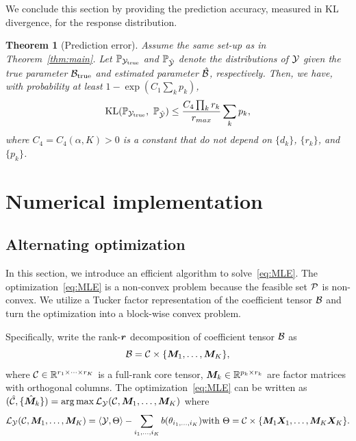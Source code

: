 \documentclass{article}
\theoremstyle{plain}
\newtheorem{thm}{Theorem}[section]
\theoremstyle{definition}
\begin{document}
We conclude this section by providing the prediction accuracy, measured in KL divergence, for the response distribution.   

\begin{thm}[Prediction error]\label{thm:KL}
Assume the same set-up as in Theorem~\ref{thm:main}. Let $\mathbb{P}_{\mathcal{Y}_{\text{true}}}$ and $\mathbb{P}_{\hat {\mathcal{Y}}}$ denote the distributions of $\mathcal{Y}$ given the true parameter $\mathcal{B}_{\text{true}}$ and estimated parameter $\hat {\mathcal{B}}$, respectively. Then, we have, with probability at least $1-\exp(C_1\sum_k p_k)$,
\begin{align*}
    \text{KL}(\mathbb{P}_{\mathcal{Y}_{\text{true}}},\ \mathbb{P}_{\hat {\mathcal{Y}}})\leq  \frac{ C_{4}\prod_kr_k}{r_{max}} \sum_k p_k,
\end{align*}
\vspace{-.1cm}
where $C_4=C_4(\alpha, K)>0$ is a constant that do not depend on $\{d_k\}$, $\{r_k\}$, and $\{p_k\}$.
\end{thm}
\vspace{-.2cm}

\section{Numerical implementation}
\subsection{Alternating optimization}
In this section, we introduce an efficient algorithm to solve~\eqref{eq:MLE}. The optimization~\eqref{eq:MLE} is a non-convex problem because the feasible set $\mathcal{P}$ is non-convex. We utilize a Tucker factor representation of the coefficient tensor $\mathcal{B}$ and turn the optimization into a block-wise convex problem. 

Specifically, write the rank-$\bm{r}$ decomposition of coefficient tensor $\mathcal{B}$ as
\vspace{-.1cm}
\begin{equation}\label{eq:tucker}
\mathcal{B}=\mathcal{C}\times \{\bm M_1,\ldots,\bm M_K\},
\end{equation}
where $\mathcal{C}\in\mathbb{R}^{r_1\times\cdots\times r_K}$ is a full-rank core tensor, $\bm M_k\in\mathbb{R}^{p_k\times r_k}$ are factor matrices with orthogonal columns. The optimization~\eqref{eq:MLE} can be written as $ (\hat {\mathcal{C}}, \{\hat {\bm M}_k\})=\arg\max \mathcal{L}_{\mathcal{Y}}(\mathcal{C}, \bm M_1,\ldots,\bm M_K) $ where 
\vspace{-.05cm}
\begin{equation*}
    \mathcal{L}_{\mathcal{Y}}(\mathcal{C}, \bm M_1,\ldots,\bm M_K) = \langle \mathcal{Y}, \Theta\rangle -\sum_{i_1,\ldots,i_K}b(\theta_{i_1,\ldots,i_K}) \text{with } \Theta =\mathcal{C}\times\{\bm M_1\bm X_1,\ldots,\bm M_K\bm X_K\}.
\end{equation*}
\vspace{-.2cm}
\end{document}
